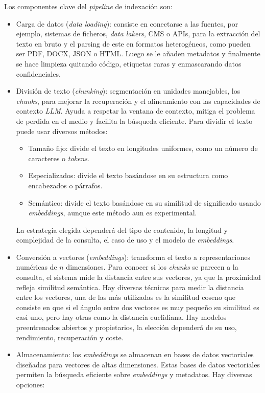 Los componentes clave del \textit{pipeline} de indexación son:
\begin{itemize}
\tightlist
	\item Carga de datos (\textit{data loading}): consiste en conectarse a las fuentes, por ejemplo, sistemas de ficheros, \textit{data lakers}, CMS o APIs, para la extracción del texto en bruto y el parsing de este en formatos heterogéneos, como pueden ser PDF, DOCX, JSON o HTML. Luego se le añaden metadatos y finalmente se hace limpieza quitando código, etiquetas raras y enmascarando datos confidenciales.
	\item División de texto (\textit{chunking}): segmentación en unidades manejables, los \textit{chunks}, para mejorar la recuperación y el alineamiento con las capacidades de contexto \textit{LLM}. Ayuda a respetar la ventana de contexto, mitiga el problema de perdida en el medio y facilita la búsqueda eficiente. Para dividir el texto puede usar diversos métodos:
	\begin{itemize}
		\item Tamaño fijo: divide el texto en longitudes uniformes, como un número de caracteres o \textit{tokens}.
		\item Especializados: divide el texto basándose en su estructura como encabezados o párrafos. 
		\item Semántico: divide el texto basándose en su similitud de significado usando \textit{embeddings}, aunque este método aun es experimental.
	\end{itemize}
	La estrategia elegida dependerá del tipo de contenido, la longitud y complejidad de la consulta, el caso de uso y el modelo de \textit{embeddings}.
	\item Conversión a vectores (\textit{embeddings}): transforma el texto a representaciones numéricas de $n$ dimensiones. Para conocer si los \textit{chunks} se parecen a la consulta, el sistema mide la distancia entre sus vectores, ya que la proximidad refleja similitud semántica. Hay diversas técnicas para medir la distancia entre los vectores, una de las más utilizadas es la similitud coseno que consiste en que si el ángulo entre dos vectores es muy pequeño su similitud es casi uno, pero hay otras como la distancia euclidiana. Hay modelos preentrenados abiertos y propietarios, la elección dependerá de su uso, rendimiento, recuperación y coste.
	\item Almacenamiento: los \textit{embeddings} se almacenan en bases de datos vectoriales diseñadas para vectores de altas dimensiones. Estas bases de datos vectoriales permiten la búsqueda eficiente sobre \textit{embeddings} y metadatos. Hay diversas opciones:

\end{itemize}
